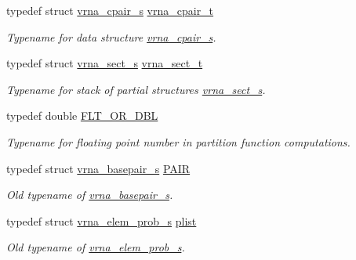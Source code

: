 \begin{DoxyCompactItemize}
typedef struct \hyperlink{group__data__structures_structvrna__cpair__s}{vrna\+\_\+cpair\+\_\+s} \hyperlink{group__data__structures_gae4fc91141cc69c6d8eaf1332cb991ecc}{vrna\+\_\+cpair\+\_\+t}
\begin{DoxyCompactList}\small\item\em Typename for data structure \hyperlink{group__data__structures_structvrna__cpair__s}{vrna\+\_\+cpair\+\_\+s}. \end{DoxyCompactList}\item 
\mbox{\label{group__data__structures_gacc9cdae790dac75a7024e7069c0d4400}} 
typedef struct \hyperlink{group__data__structures_structvrna__sect__s}{vrna\+\_\+sect\+\_\+s} \hyperlink{group__data__structures_gacc9cdae790dac75a7024e7069c0d4400}{vrna\+\_\+sect\+\_\+t}
\begin{DoxyCompactList}\small\item\em Typename for stack of partial structures \hyperlink{group__data__structures_structvrna__sect__s}{vrna\+\_\+sect\+\_\+s}. \end{DoxyCompactList}\item 
\mbox{\label{group__data__structures_ga31125aeace516926bf7f251f759b6126}} 
typedef double \hyperlink{group__data__structures_ga31125aeace516926bf7f251f759b6126}{F\+L\+T\+\_\+\+O\+R\+\_\+\+D\+BL}
\begin{DoxyCompactList}\small\item\em Typename for floating point number in partition function computations. \end{DoxyCompactList}\item 
typedef struct \hyperlink{group__data__structures_structvrna__basepair__s}{vrna\+\_\+basepair\+\_\+s} \hyperlink{group__data__structures_ga4381025ffbd692e54189b2c679c79c99}{P\+A\+IR}
\begin{DoxyCompactList}\small\item\em Old typename of \hyperlink{group__data__structures_structvrna__basepair__s}{vrna\+\_\+basepair\+\_\+s}. \end{DoxyCompactList}\item 
typedef struct \hyperlink{group__struct__utils__plist_structvrna__elem__prob__s}{vrna\+\_\+elem\+\_\+prob\+\_\+s} \hyperlink{group__data__structures_ga9608eed021ebfbdd7a901cfdc446c8e9}{plist}
\begin{DoxyCompactList}\small\item\em Old typename of \hyperlink{group__struct__utils__plist_structvrna__elem__prob__s}{vrna\+\_\+elem\+\_\+prob\+\_\+s}. \end{DoxyCompactList}\item 

\end{DoxyCompactItemize}
